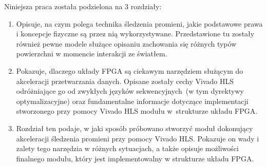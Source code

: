 {Niniejsza praca została podzielona na 3 rozdziały:
\begin{enumerate}
\item Opisuje, na czym polega technika śledzenia promieni, jakie podstawowe prawa i koncepcje fizyczne są przez nią wykorzystywane. Przedstawione tu zostały również pewne modele służące opisaniu zachowania się różnych typów powierzchni w momencie interakcji ze światłem.
\item Pokazuje, dlaczego układy FPGA są ciekawym narzędziem służącym do akceleracji przetwarzania danych. Opisane zostały cechy Vivado HLS odróżniające go od zwykłych języków sekwencyjnych~(w tym dyrektywy optymalizacyjne) oraz fundamentalne informacje dotyczące  implementacji stworzonego przy pomocy Vivado HLS modułu w~strukturze układu FPGA.
\item Rozdział ten podaje, w jaki sposób próbowano stworzyć moduł dokonujący akceleracji śledzenia promieni przy pomocy Vivado HLS. Pokazuje on wady i zalety tego narzędzia w różnych sytuacjach, a także opisuje możliwości finalnego modułu, który jest implementowalny w strukturze układu FPGA. 
\end{enumerate}
}
